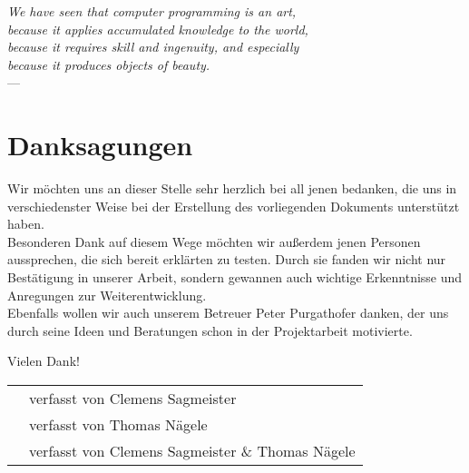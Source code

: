 
\begin{flushright}{\slshape    
    We have seen that computer programming is an art, \\ 
    because it applies accumulated knowledge to the world, \\ 
    because it requires skill and ingenuity, and especially \\
    because it produces objects of beauty.} \\ \medskip
    ---  \citep{knuth:1974}
\end{flushright}

\bigskip

\begingroup
\let\clearpage\relax
\let\cleardoublepage\relax
\let\cleardoublepage\relax
\chapter*{Danksagungen}
Wir möchten uns an dieser Stelle sehr herzlich bei all jenen bedanken, die uns in verschiedenster Weise bei der Erstellung des vorliegenden Dokuments unterstützt haben. \\
Besonderen Dank auf diesem Wege möchten wir außerdem jenen Personen aussprechen, die sich bereit erklärten \scribbler zu testen. Durch sie fanden wir nicht nur Bestätigung in unserer Arbeit, sondern gewannen auch wichtige Erkenntnisse und Anregungen zur Weiterentwicklung.\\
Ebenfalls wollen wir auch unserem Betreuer Peter Purgathofer danken, der uns durch seine Ideen und Beratungen schon in der Projektarbeit motivierte.

\medskip \noindent Vielen Dank!


\endgroup


\hfill

\vfill

\vspace*{0.5cm}

\begin{center}
\begin{footnotesize}
	\textcolor{Gray}{
		\begin{tabular}{rp{7cm}}
			\cs & verfasst von Clemens Sagmeister \\
			\tn & verfasst von Thomas Nägele \\
			\cs \tn & verfasst von Clemens Sagmeister \& Thomas Nägele \\
		\end{tabular} }
\end{footnotesize}
\end{center}


